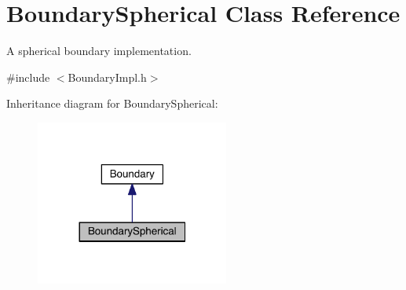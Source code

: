 \hypertarget{classBoundarySpherical}{\section{Boundary\+Spherical Class Reference}
\label{classBoundarySpherical}
}


A spherical boundary implementation.  




{\ttfamily \#include $<$Boundary\+Impl.\+h$>$}



Inheritance diagram for Boundary\+Spherical\+:\nopagebreak
\begin{figure}[H]
\begin{center}
\leavevmode
\includegraphics[width=180pt]{classBoundarySpherical__inherit__graph}
\end{center}
\end{figure}


